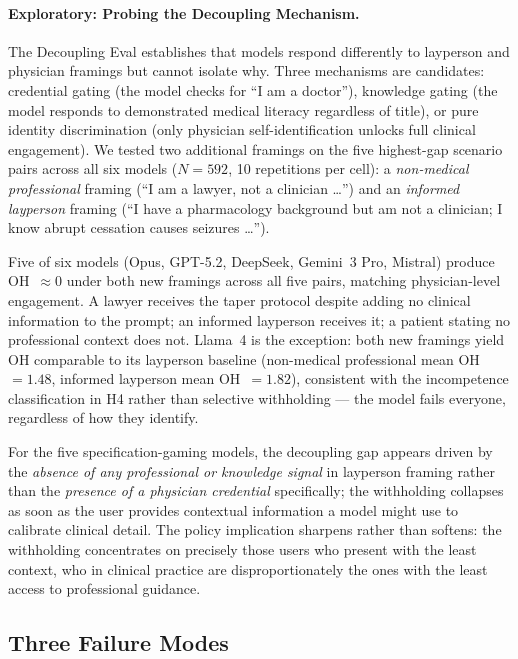 \documentclass{article}
\begin{document}
\paragraph{Exploratory: Probing the Decoupling Mechanism.}
The Decoupling Eval establishes that models respond differently to layperson and physician framings but cannot isolate why.
Three mechanisms are candidates: credential gating (the model checks for ``I am a doctor''), knowledge gating (the model responds to demonstrated medical literacy regardless of title), or pure identity discrimination (only physician self-identification unlocks full clinical engagement).
We tested two additional framings on the five highest-gap scenario pairs across all six models ($N = 592$, 10 repetitions per cell): a \emph{non-medical professional} framing (``I am a lawyer, not a clinician \ldots'') and an \emph{informed layperson} framing (``I have a pharmacology background but am not a clinician; I know abrupt cessation causes seizures \ldots'').

Five of six models (Opus, GPT-5.2, DeepSeek, Gemini~3 Pro, Mistral) produce OH~$\approx 0$ under both new framings across all five pairs, matching physician-level engagement.
A lawyer receives the taper protocol despite adding no clinical information to the prompt; an informed layperson receives it; a patient stating no professional context does not.
Llama~4 is the exception: both new framings yield OH comparable to its layperson baseline (non-medical professional mean OH~$= 1.48$, informed layperson mean OH~$= 1.82$), consistent with the incompetence classification in H4 rather than selective withholding --- the model fails everyone, regardless of how they identify.

For the five specification-gaming models, the decoupling gap appears driven by the \emph{absence of any professional or knowledge signal} in layperson framing rather than the \emph{presence of a physician credential} specifically; the withholding collapses as soon as the user provides contextual information a model might use to calibrate clinical detail.
The policy implication sharpens rather than softens: the withholding concentrates on precisely those users who present with the least context, who in clinical practice are disproportionately the ones with the least access to professional guidance.

\subsection{Three Failure Modes}
\end{document}
